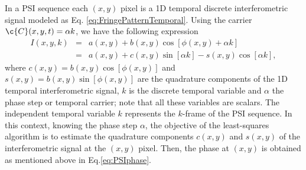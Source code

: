 In a PSI sequence each $(x,y)$ pixel is a 1D temporal discrete interferometric 
signal modeled as Eq. \eqref{eq:FringePatternTemporal}. Using the carrier 
$\c{C}(x,y,t)=\alpha k$, we have the following expression
\begin{eqnarray}
  I(x,y,k) &=& a(x,y) + b(x,y)\cos[\phi(x,y) +\alpha k] \nonumber \\
  &=& a(x,y) + c(x,y)\sin[\alpha k] - s(x,y)\cos[\alpha k],
  \label{eq:PSI_Sequence}
\end{eqnarray}
where $c(x,y)=b(x,y)\cos[\phi(x,y)]$ and
$s(x,y)=b(x,y)\sin[\phi(x,y)]$ are the quadrature components of the
1D temporal interferometric signal, $k$ is the discrete temporal
variable and $\alpha$ the phase step or temporal carrier; note that
all these variables are scalars. The independent temporal variable $k$
represents the $k$-frame of the PSI sequence. In this context, knowing
the phase step $\alpha$, the objective of the least-squares algorithm is to 
estimate the quadrature components $c(x,y)$ and $s(x,y)$ of the interferometric
signal at the $(x,y)$ pixel. Then, the phase at $(x,y)$ is obtained as 
mentioned above in Eq.\eqref{eq:PSIphase}.


